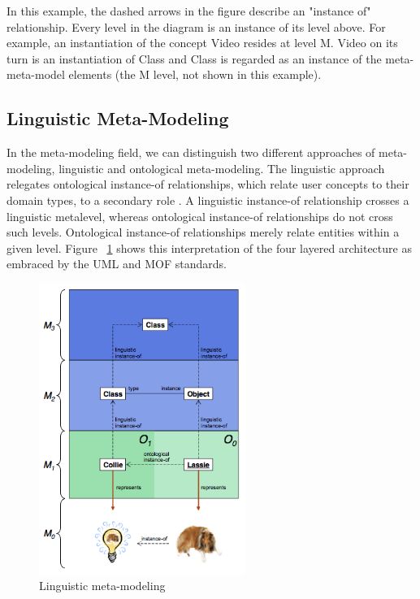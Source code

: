 In this example, the dashed arrows in the figure describe an "instance of" relationship. Every level in the diagram is an instance of its level above. For example, an instantiation of the concept Video resides at level M. Video on its turn is an instantiation of Class and Class is regarded as an instance of the meta-meta-model elements (the M level, not shown in this example).

\subsection{Linguistic Meta-Modeling}

In the meta-modeling field, we can distinguish two different approaches of meta-modeling, linguistic and ontological meta-modeling. The linguistic approach relegates ontological instance-of relationships, which relate user concepts to their domain types, to a secondary role \cite{MDDFound}. A linguistic instance-of relationship crosses a linguistic metalevel, whereas ontological instance-of relationships do not cross such levels. Ontological instance-of relationships merely relate entities within a given level. Figure ~\ref{fig:ling_mm} shows this interpretation of the four layered architecture as embraced by the UML and MOF standards. 
\begin{figure}[h!]
\centering
\includegraphics[width=0.6\textwidth]{images/chap2_linguistic_mm.png}
\caption{Linguistic meta-modeling \cite{MDDFound}}
\label{fig:ling_mm}
\end{figure}


